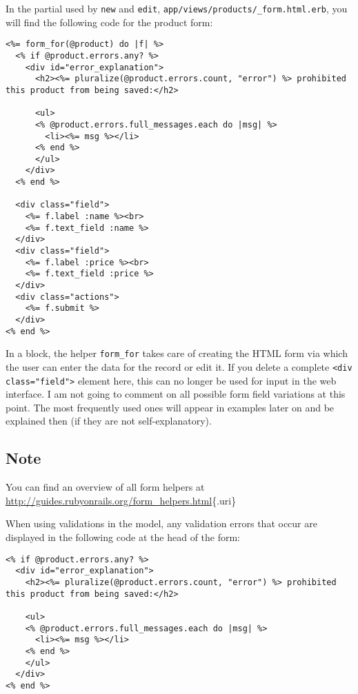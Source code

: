 \documentclass[a4paper]{book}
\begin{document}
In the partial used by \texttt{new} and \texttt{edit}, \texttt{app/views/products/\_form.html.erb}, you will find the following code for the product form:

\begin{shaded}\begin{verbatim}
<%= form_for(@product) do |f| %>
  <% if @product.errors.any? %>
    <div id="error_explanation">
      <h2><%= pluralize(@product.errors.count, "error") %> prohibited this product from being saved:</h2>

      <ul>
      <% @product.errors.full_messages.each do |msg| %>
        <li><%= msg %></li>
      <% end %>
      </ul>
    </div>
  <% end %>

  <div class="field">
    <%= f.label :name %><br>
    <%= f.text_field :name %>
  </div>
  <div class="field">
    <%= f.label :price %><br>
    <%= f.text_field :price %>
  </div>
  <div class="actions">
    <%= f.submit %>
  </div>
<% end %>
\end{verbatim}\end{shaded}

In a block, the helper \texttt{form\_for} takes care of creating the HTML form via which the user can enter the data for the record or edit it. If you delete a complete \texttt{\textless{}div         class="field"\textgreater{}} element here, this can no longer be used for input in the web interface. I am not going to comment on all possible form field variations at this point. The most frequently used ones will appear in examples later on and be explained then (if they are not self-explanatory).

\subsection{Note}\label{note-34}

You can find an overview of all form helpers at \url{http://guides.rubyonrails.org/form_helpers.html}\{.uri\}

When using validations in the model, any validation errors that occur are displayed in the following code at the head of the form:

\begin{shaded}\begin{verbatim}
<% if @product.errors.any? %>
  <div id="error_explanation">
    <h2><%= pluralize(@product.errors.count, "error") %> prohibited this product from being saved:</h2>

    <ul>
    <% @product.errors.full_messages.each do |msg| %>
      <li><%= msg %></li>
    <% end %>
    </ul>
  </div>
<% end %>
\end{verbatim}\end{shaded}
\end{document}
